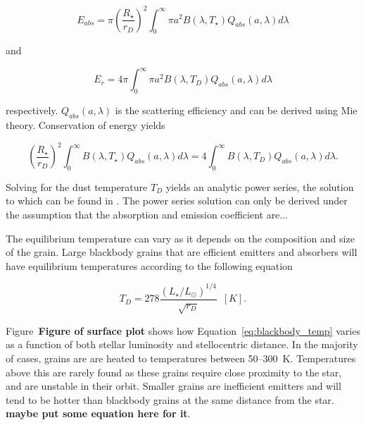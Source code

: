             \begin{equation}\label{eq:energy_absorbed}
            E_{abs} = \pi \left(\frac{R_\star}{r_D}\right)^2 \int_0^\infty \pi a^2 B(\lambda,T_\star) Q_{abs}(a,\lambda) d\lambda
            \end{equation}
            
            and
            
            \begin{equation}\label{eq:energy_emitted}
            E_{r} = 4\pi \int_0^\infty \pi a^2 B(\lambda,T_D) Q_{abs}(a,\lambda) d\lambda
            \end{equation}
            
            respectively. $Q_{abs}(a,\lambda)$ is the scattering efficiency and can be derived using Mie theory. Conservation of energy yields
            
            \begin{equation}\label{eq:conserve_energy}
             \left(\frac{R_\star}{r_D}\right)^2 \int_0^\infty B(\lambda,T_\star) Q_{abs}(a,\lambda) d\lambda = 4 \int_0^\infty B(\lambda,T_D) Q_{abs}(a,\lambda) d\lambda.
            \end{equation}
            
            Solving for the dust temperature $T_D$ yields an analytic power series, the solution to which can be found in \citet{Backman1993}.  The power series solution can only be derived under the assumption that the absorption and emission coefficient are...
            
            The equilibrium temperature can vary as it depends on the composition and size of the grain. Large blackbody grains that are efficient emitters and absorbers will have equilibrium temperatures according to the following equation 
            
            
            \begin{equation}\label{eq:blackbody_temp}
            T_D = 278 \frac{\left(L_\star/L_\odot \right)^{1/4}}{\sqrt{r_D}}\enspace [K]. 
            \end{equation}
            
        Figure~\textbf{Figure of surface plot} shows how Equation~\ref{eq:blackbody_temp} varies as a function of both stellar luminosity and stellocentric distance. In the majority of cases, grains are are heated to temperatures between 50--300~K. Temperatures above this are rarely found as these grains require close proximity to the star, and are unstable in their orbit. Smaller grains are inefficient emitters and will tend to be hotter than blackbody grains at the same distance from the star. \textbf{maybe put some equation here for it}.
            

